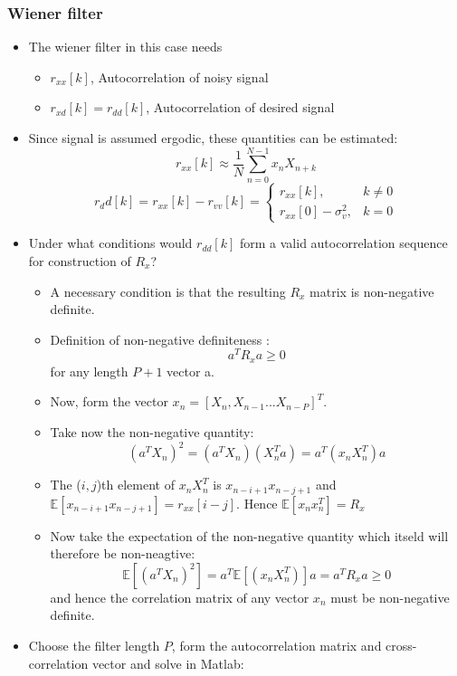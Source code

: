 \documentclass[12pt]{article}
\newcommand{\sigd}{\sigma^2}
\newcommand{\mexp}{\mathbb{E}}
\newcommand{\autocox}{r_{xx}}
\begin{document}
\subsubsection{Wiener filter}
\begin{itemize}
    \item The wiener filter in this case needs
    \begin{itemize}
        \item $r_{xx}[k]$, Autocorrelation of noisy signal
        \item $r_{xd}[k] = r_{dd}[k]$, Autocorrelation of desired signal
    \end{itemize}
    \item Since signal is assumed ergodic, these quantities can be estimated:
    \[
    \autocox[k]\approx\frac{1}{N} \sum_{n=0}^{N-1}x_n X_{n+k}
    \]
    \[
    r_dd[k] = r_{xx}[k] -r_{vv}[k] = \left\{ \begin{array}{ll}
        \autocox[k], & k \not = 0 \\
        \autocox[0] -\sigd_v ,& k =0 
    \end{array} \right. 
    \]
    \item Under what conditions would $r_{dd}[k]$ form a valid autocorrelation sequence for construction of $R_x$?
    \begin{itemize}
        \item A necessary condition is that the resulting $R_x$ matrix is non-negative definite.
        \item Definition of non-negative definiteness :
        \[
        a^T R_x a \ge 0
        \]
        for any length $P+1$ vector a.
        \item Now, form the vector $x_n = [X_n,X_{n-1}...X_{n-P}]^T$.
        \item Take now the non-negative quantity:
        \[
        (a^T X_n)^2 = (a^T X_n)(X_n^T a) = a^T (x_n X_n^T) a
        \]
        \item The ($i,j$)th element of $x_n X_n^T$ is $x_{n-i+1}x_{n-j+1}$ and $\mexp[x_{n-i+1}x_{n-j+1}] = \autocox[i-j]$. Hence $\mexp[x_n x_n^T] = R_x$
        \item Now take the expectation of the non-negative quantity which itseld will therefore be non-neagtive:
        \[
        \mexp[(a^T X_n)^2] = a^T \mexp[(x_n X_n^T)] a = a^T R_x a \ge 0
        \]
        and hence the correlation matrix of any vector $x_n$ must be non-negative definite.
    \end{itemize}
    \item Choose the filter length $P$, form the autocorrelation matrix and cross-correlation vector and solve in Matlab:

\end{itemize}
\end{document}
